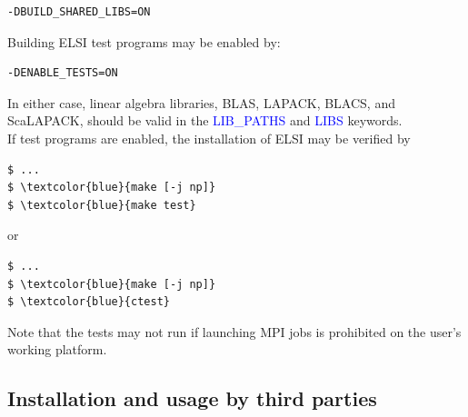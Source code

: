 \documentclass{report}
\begin{document}
\begin{verbatim}
-DBUILD_SHARED_LIBS=ON
\end{verbatim}

Building ELSI test programs may be enabled by:\\

\begin{verbatim}
-DENABLE_TESTS=ON
\end{verbatim}

In either case, linear algebra libraries, BLAS, LAPACK, BLACS, and ScaLAPACK, should be valid in the \textcolor{blue}{LIB\_PATHS} and \textcolor{blue}{LIBS} keywords.\\

If test programs are enabled, the installation of ELSI may be verified by\\

\begin{Verbatim}[commandchars=\\\{\}]
$ ...
$ \textcolor{blue}{make [-j np]}
$ \textcolor{blue}{make test}
\end{Verbatim}

or\\

\begin{Verbatim}[commandchars=\\\{\}]
$ ...
$ \textcolor{blue}{make [-j np]}
$ \textcolor{blue}{ctest}
\end{Verbatim}

Note that the tests may not run if launching MPI jobs is prohibited on the user's working platform.\\

\subsection{Installation and usage by third parties}
\end{document}
